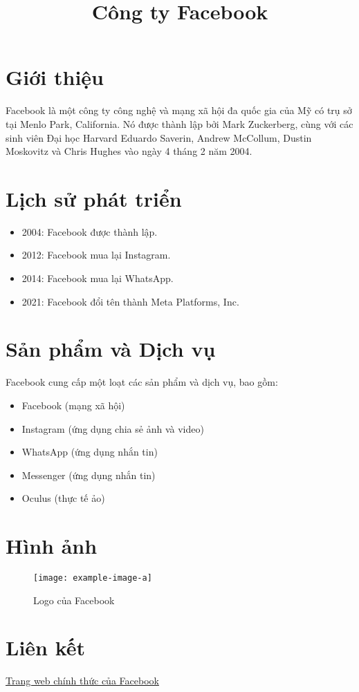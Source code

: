\documentclass{article}
\title{Công ty Facebook}
\author{}
\date{}
\begin{document}
\maketitle

\section{Giới thiệu}

Facebook là một công ty công nghệ và mạng xã hội đa quốc gia của Mỹ có trụ sở tại Menlo Park, California. Nó được thành lập bởi Mark Zuckerberg, cùng với các sinh viên Đại học Harvard Eduardo Saverin, Andrew McCollum, Dustin Moskovitz và Chris Hughes vào ngày 4 tháng 2 năm 2004.

\section{Lịch sử phát triển}

\begin{itemize}
    \item 2004: Facebook được thành lập.
    \item 2012: Facebook mua lại Instagram.
    \item 2014: Facebook mua lại WhatsApp.
    \item 2021: Facebook đổi tên thành Meta Platforms, Inc.
\end{itemize}

\section{Sản phẩm và Dịch vụ}

Facebook cung cấp một loạt các sản phẩm và dịch vụ, bao gồm:

\begin{itemize}
    \item Facebook (mạng xã hội)
    \item Instagram (ứng dụng chia sẻ ảnh và video)
    \item WhatsApp (ứng dụng nhắn tin)
    \item Messenger (ứng dụng nhắn tin)
    \item Oculus (thực tế ảo)
\end{itemize}

\section{Hình ảnh}

\begin{figure}[h!]
    \centering
    \texttt{[image: example-image-a]}
    \caption{Logo của Facebook}
    \label{fig:facebook_logo}
\end{figure}

\section{Liên kết}

\href{https://www.facebook.com}{Trang web chính thức của Facebook}
\end{document}

